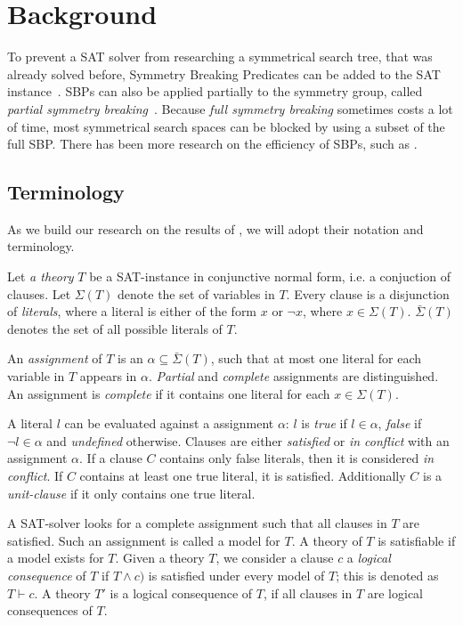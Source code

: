 	\section{Background} \label{sec:Background}
		To prevent a SAT solver from researching a symmetrical search tree, that was already solved
		before, Symmetry Breaking Predicates can be added to the SAT
		instance~\cite{sakallah2009symmetry}. SBPs can also be applied partially to the symmetry
		group, called \textit{partial symmetry breaking}~\cite{sakallah2009symmetry}. Because
		\textit{full symmetry breaking} sometimes costs a lot of time, most symmetrical search
		spaces can be blocked by using a subset of the full SBP. There has been more research on
		the efficiency of SBPs, such as \cite{aloul2006efficient}.

		\subsection{Terminology}
			As we build our research on the results of \cite{devriendt2012symmetry}, we will adopt
			their notation and terminology.

			Let \emph{a theory} $T$ be a SAT-instance in conjunctive normal form, i.e. a conjuction
			of clauses.
			Let $\Sigma(T)$ denote the set of variables in $T$.
			Every clause is a disjunction of \emph{literals}, where a literal is either of the form
			$x$ or $\neg x$, where $x \in \Sigma(T)$.
			$\bar\Sigma(T)$ denotes the set of all possible literals of $T$.

			An \emph{assignment} of $T$ is an $\alpha \subseteq \bar\Sigma(T)$, such that at most
			one literal for each variable in $T$ appears in $\alpha$.
			\emph{Partial} and \emph{complete} assignments are distinguished.
			An assignment is \emph{complete} if it contains one literal for each $x \in \Sigma(T)$.

			A literal $l$ can be evaluated against a assignment $\alpha$: $l$ is \emph{true} if $l \in
			\alpha$, \emph{false} if $\neg l \in \alpha$ and \emph{undefined} otherwise.
			Clauses are either \emph{satisfied} or \emph{in conflict} with an assignment $\alpha$.
			If a clause $C$ contains only false literals, then it is considered \emph{in conflict}.
			If $C$ contains at least one true literal, it is satisfied.
			Additionally $C$ is a \emph{unit-clause} if it only contains one true literal.

			A SAT-solver looks for a complete assignment such that all clauses in $T$ are satisfied.
			Such an assignment is called a model for $T$.
			A theory of $T$ is satisfiable if a model exists for $T$.
			Given a theory $T$, we consider a clause $c$ a \emph{logical consequence} of $T$ if
			$T \wedge c)$ is satisfied under every model of $T$; this is denoted as $T \vdash c$.
			A theory $T'$ is a logical consequence of $T$, if all clauses in $T$ are logical
			consequences of $T$.

